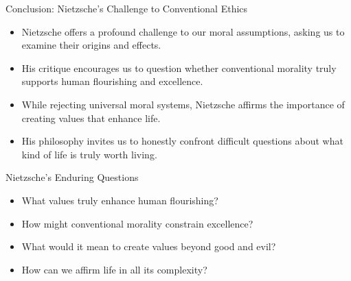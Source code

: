 \documentclass{beamer}
\begin{document}
       
    \begin{frame}{Conclusion: Nietzsche's Challenge to Conventional Ethics}
    \begin{itemize}
    \item Nietzsche offers a profound challenge to our moral assumptions, asking us to examine their origins and effects.
    \item His critique encourages us to question whether conventional morality truly supports human flourishing and excellence.
    \item While rejecting universal moral systems, Nietzsche affirms the importance of creating values that enhance life.
    \item His philosophy invites us to honestly confront difficult questions about what kind of life is truly worth living.
    \end{itemize}
    
    \begin{alertblock}{Nietzsche's Enduring Questions}
    \begin{itemize}
    \item What values truly enhance human flourishing?
    \item How might conventional morality constrain excellence?
    \item What would it mean to create values beyond good and evil?
    \item How can we affirm life in all its complexity?
    \end{itemize}
    \end{alertblock}
    
    \end{frame}
\end{document}
